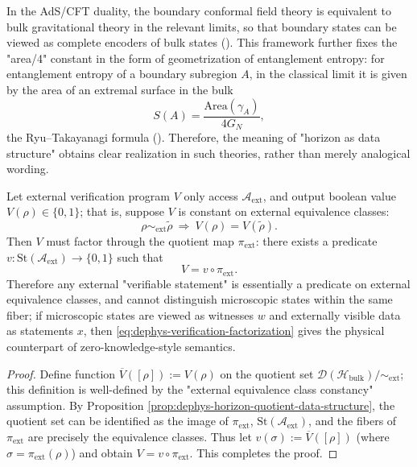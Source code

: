 \begin{remark}\label{rem:dephys-adscft-explicit-encoder}
In the AdS/CFT duality, the boundary conformal field theory is equivalent to bulk gravitational theory in the relevant limits, so that boundary states can be viewed as complete encoders of bulk states (\cite{Maldacena1999LargeN}).
This framework further fixes the "area/4" constant in the form of geometrization of entanglement entropy:
for entanglement entropy of a boundary subregion \(A\), in the classical limit it is given by the area of an extremal surface in the bulk
\[
S(A)=\frac{\mathrm{Area}(\gamma_A)}{4G_N},
\]
the Ryu--Takayanagi formula (\cite{RyuTakayanagi2006HolographicEntanglementEntropy}).
Therefore, the meaning of "horizon as data structure" obtains clear realization in such theories, rather than merely analogical wording.
\end{remark}

\begin{proposition}\label{prop:dephys-zero-knowledge-quotient-factorization}
Let external verification program \(V\) only access \(\mathcal{A}_{\mathrm{ext}}\), and output boolean value \(V(\rho)\in\{0,1\}\);
that is, suppose \(V\) is constant on external equivalence classes:
\[
\rho\sim_{\mathrm{ext}}\tilde\rho\ \Longrightarrow\ V(\rho)=V(\tilde\rho).
\]
Then \(V\) must factor through the quotient map \(\pi_{\mathrm{ext}}\): there exists a predicate
\(
v:\mathrm{St}(\mathcal{A}_{\mathrm{ext}})\to\{0,1\}
\)
such that
\begin{equation}\label{eq:dephys-verification-factorization}
\boxed{\;
V=v\circ \pi_{\mathrm{ext}}.\;}
\end{equation}
Therefore any external "verifiable statement" is essentially a predicate on external equivalence classes, and cannot distinguish microscopic states within the same fiber;
if microscopic states are viewed as witnesses \(w\) and externally visible data as statements \(x\), then \eqref{eq:dephys-verification-factorization} gives the physical counterpart of zero-knowledge-style semantics.
\end{proposition}

\begin{proof}
Define function \(\overline V([\rho]) := V(\rho)\) on the quotient set \(\mathcal{D}(\mathcal{H}_{\mathrm{bulk}})/{\sim_{\mathrm{ext}}}\);
this definition is well-defined by the "external equivalence class constancy" assumption.
By Proposition \ref{prop:dephys-horizon-quotient-data-structure}, the quotient set can be identified as the image of \(\pi_{\mathrm{ext}}\),
\(\mathrm{St}(\mathcal{A}_{\mathrm{ext}})\), and the fibers of \(\pi_{\mathrm{ext}}\) are precisely the equivalence classes.
Thus let \(v(\sigma):=\overline V([\rho])\) (where \(\sigma=\pi_{\mathrm{ext}}(\rho)\)) and obtain \(V=v\circ\pi_{\mathrm{ext}}\).
This completes the proof.
\end{proof}

